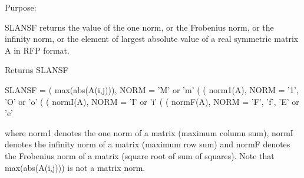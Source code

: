  \begin{DoxyParagraph}{Purpose\+: }
\begin{DoxyVerb} SLANSF returns the value of the one norm, or the Frobenius norm, or
 the infinity norm, or the element of largest absolute value of a
 real symmetric matrix A in RFP format.\end{DoxyVerb}

\end{DoxyParagraph}
\begin{DoxyReturn}{Returns}
S\+L\+A\+N\+S\+F \begin{DoxyVerb}    SLANSF = ( max(abs(A(i,j))), NORM = 'M' or 'm'
             (
             ( norm1(A),         NORM = '1', 'O' or 'o'
             (
             ( normI(A),         NORM = 'I' or 'i'
             (
             ( normF(A),         NORM = 'F', 'f', 'E' or 'e'

 where  norm1  denotes the  one norm of a matrix (maximum column sum),
 normI  denotes the  infinity norm  of a matrix  (maximum row sum) and
 normF  denotes the  Frobenius norm of a matrix (square root of sum of
 squares).  Note that  max(abs(A(i,j)))  is not a  matrix norm.\end{DoxyVerb}
 
\end{DoxyReturn}

